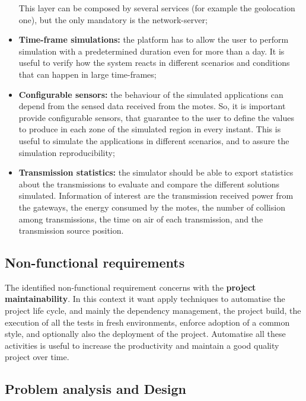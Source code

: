 \begin{itemize}
    This layer can be composed by several services (for example the geolocation one), but the only mandatory is the network-server;
    \item \textbf{Time-frame simulations:} the platform has to allow the user to perform simulation with a predetermined duration even for more than a day. It is useful to verify how the system reacts in different scenarios and conditions that can happen in large time-frames; 
    \item \textbf{Configurable sensors:} the behaviour of the simulated applications can depend from the sensed data received from the motes. So, it is important provide configurable sensors, that guarantee to the user to define the values to produce in each zone of the simulated region in every instant.
    This is useful to simulate the applications in different scenarios, and to assure the simulation reproducibility;
    \item \textbf{Transmission statistics:} the simulator should be able to export statistics about the transmissions to evaluate and compare the different solutions simulated. Information of interest are the transmission received power from the gateways, the energy consumed by the motes, the number of collision among transmissions, the time on air of each transmission, and the transmission source position.
\end{itemize}

\subsection*{Non-functional requirements}

The identified non-functional requirement concerns with the \textbf{project maintainability}. 
In this context it want apply techniques to automatise the project life cycle, and mainly the dependency management, the project build, the execution of all the tests in fresh environments, enforce adoption of a common style, and optionally also the deployment of the project.
Automatise all these activities is useful to increase the productivity and maintain a good quality project over time.


\subsection{Problem analysis and Design}

